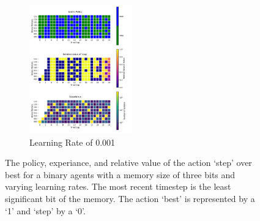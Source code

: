 \documentclass[a4paper]{article}
\begin{document}
\begin{figure}[ht]
    \begin{subfigure}[b]{0.24\textwidth}
        \centering
        \includegraphics[width=12em]{../figures/policy_b3_lr001.pdf}
        \caption{Learning Rate of 0.001}
        \label{b3_lr001}
    \end{subfigure}
    \caption{
        The policy, experiance, and relative value of the action `step'
        over best for a binary agents with a memory size of three bits
        and varying learning rates. The most recent timestep
        is the least significant bit of the memory.
        The action `best' is represented by a `1' and `step' by a `0'.
    }
    \label{policy_b3}
\end{figure}
\end{document}
